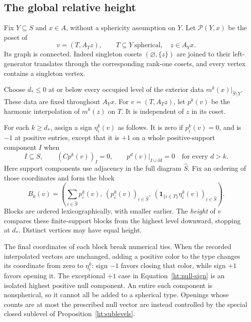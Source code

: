 \subsection{The global relative height}

Fix \(Y\subseteq S\) and \(x\in A\), without a sphericity assumption on
\(Y\).  Let \(\mathcal P(Y,x)\) be the poset of
\[
 v=(T,A_Tz),\qquad T\subseteq Y\ \text{spherical},\quad z\in A_Yx.
\]
Its graph is connected.  Indeed singleton cosets \((\varnothing,\{z\})\)
are joined to their left-generator translates through the corresponding
rank-one cosets, and every vertex contains a singleton vertex.

Choose \(d_*\le0\) at or below every occupied level of the exterior data
\(m^k(x)|_{\widehat S\setminus Y}\).
These data are fixed throughout \(A_Yx\).
For \(v=(T,A_Tz)\), let \(p^k(v)\) be the harmonic interpolation of
\(m^k(z)\) on \(T\).  It is independent of \(z\) in its coset.

For each \(k\ge d_*\), assign a sign \(\eta_i^k(v)\) as follows.
It is zero if \(p_i^k(v)=0\), and is \(-1\) at positive entries, except
that it is \(+1\) on a whole positive-support component \(I\) when
\begin{equation}
 I\subseteq S,\qquad (Cp^k(v))_I=0,\qquad
 p^d(v)|_{I\cup\partial I}=0\quad\text{for every }d>k.
 \label{ht:null-sign}
\end{equation}
Here support components use adjacency in the full diagram
\(\widehat S\).  Fix an ordering of those coordinates and form the block
\begin{equation}
 B_k(v)=
 \left(
  \sum_{i\in\widehat S}p_i^k(v),\
  (p_i^k(v))_{i\in\widehat S},\
  (\mathbf1_{\{i\in T\}}\eta_i^k(v))_{i\in\widehat S}
 \right).
 \label{ht:block}
\end{equation}
Blocks are ordered lexicographically, with smaller earlier.
The \emph{height} of \(v\) compares these finite-support blocks from the
highest level downward, stopping at \(d_*\).
Distinct vertices may have equal height.

The final coordinates of each block break numerical ties.  When the
recorded interpolated vectors are unchanged, adding a positive color to
the type changes its coordinate from zero to \(\eta_i^k\): sign \(-1\)
favors closing that color, while sign \(+1\) favors opening it.
The exceptional \(+1\) case in Equation~\eqref{ht:null-sign} is an
isolated highest positive null component.  An entire such component is
nonspherical, so it cannot all be added to a spherical type.  Openings
whose counts are at most the prescribed null vector are instead
controlled by the special closed sublevel of
Proposition~\ref{ht:sublevels}.

